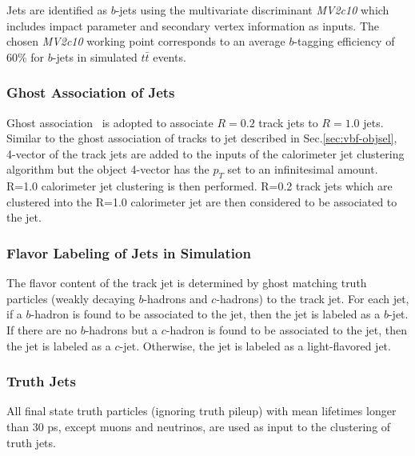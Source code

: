 Jets are identified as $b$-jets using the multivariate discriminant \textit{MV2c10} \cite{btag} which includes impact parameter and secondary vertex information as inputs. The chosen \textit{MV2c10} working point corresponds to an average $b$-tagging efficiency of 60\% for $b$-jets in simulated $t\bar{t}$ events.  

\subsubsection{Ghost Association of Jets}

Ghost association~\cite{area} is adopted to associate $R=0.2$ track jets to $R=1.0$ jets. Similar to the ghost association of tracks to jet described in Sec.\ref{sec:vbf-objsel}, 4-vector of the track jets are added to the inputs of the calorimeter jet clustering algorithm but the object 4-vector has the $p_T$ set to an infinitesimal amount.  R=1.0 calorimeter jet clustering is then performed. R=0.2 track jets which are clustered into the R=1.0 calorimeter jet are then considered to be associated to the jet.  

\subsubsection{Flavor Labeling of Jets in Simulation}

The flavor content of the track jet is determined by ghost matching truth particles (weakly decaying $b$-hadrons and $c$-hadrons) to the track jet. For each jet, if a $b$-hadron is found to be associated to the jet, then the jet is labeled as a $b$-jet.  If there are no $b$-hadrons but a $c$-hadron is found to be associated to the jet, then the jet is labeled as a $c$-jet. Otherwise, the jet is labeled as a light-flavored jet. 

\subsubsection{Truth Jets}
All final state truth particles (ignoring truth pileup) with mean lifetimes longer than 30 ps, except muons and neutrinos, are used as input to the clustering of truth jets. 
